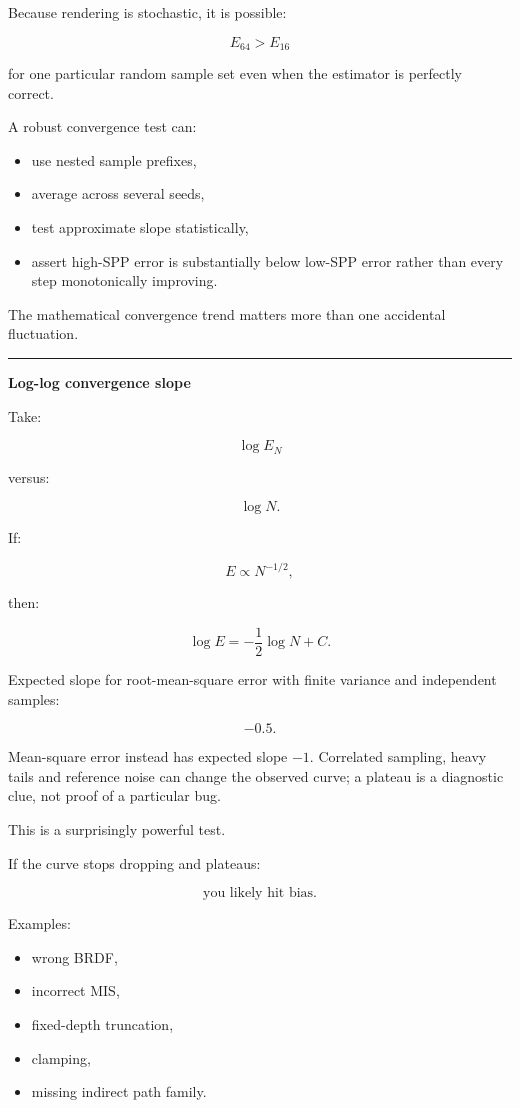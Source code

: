 Because rendering is stochastic, it is possible:

\[
E_{64}>E_{16}
\]

for one particular random sample set even when the estimator is perfectly correct.

A robust convergence test can:

\begin{itemize}
\tightlist
\item
  use nested sample prefixes,
\item
  average across several seeds,
\item
  test approximate slope statistically,
\item
  assert high-SPP error is substantially below low-SPP error rather than every step monotonically improving.
\end{itemize}

The mathematical convergence trend matters more than one accidental fluctuation.

\begin{center}\rule{0.5\linewidth}{0.5pt}\end{center}

\textbf{Log-log convergence slope}

Take:

\[
\log E_N
\]

versus:

\[
\log N.
\]

If:

\[
E\propto N^{-1/2},
\]

then:

\[
\log E
=
-\frac12\log N+C.
\]

Expected slope for root-mean-square error with finite variance and independent samples:

\[
\boxed{-0.5.}
\]

Mean-square error instead has expected slope \(-1\). Correlated sampling, heavy tails and reference noise can change the observed curve; a plateau is a diagnostic clue, not proof of a particular bug.

This is a surprisingly powerful test.

If the curve stops dropping and plateaus:

\[
\boxed{
\text{you likely hit bias}.
}
\]

Examples:

\begin{itemize}
\tightlist
\item
  wrong BRDF,
\item
  incorrect MIS,
\item
  fixed-depth truncation,
\item
  clamping,
\item
  missing indirect path family.
\end{itemize}

